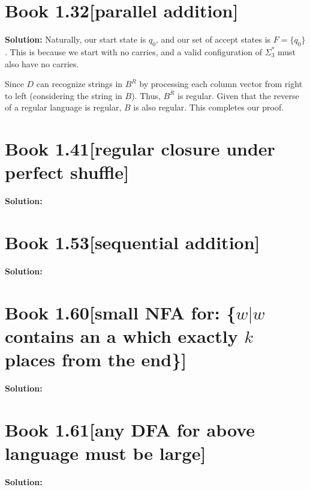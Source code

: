 \documentclass[11pt]{article}
\newenvironment{question}[2]
{\newpage\section{#1\texorpdfstring{\hfill}{horizontal spacing}{\rm\normalsize #2}}}{}
\newenvironment{solution}
{\textbf{Solution: }\color{blue}}
{\color{black}}
\begin{document}
\begin{question}{Book 1.32}{[parallel addition]}
\begin{solution}
Naturally, our start state is \(q_0\), and our set of accept states is \(F=\{q_0\}\). This is because we start with no carries, and a valid configuration of \(\Sigma_{3}^{*}\) must also have no carries.

Since \(D\) can recognize strings in \(B^{R}\) by processing each column vector from right to left (considering the string in \(B\)). Thus, \(B^{R}\) is regular. Given that the reverse of a regular language is regular, \(B\) is also regular. This completes our proof.

\end{solution}
\end{question}


\begin{question}{Book 1.41}{[regular closure under perfect shuffle]}


\begin{solution}

\end{solution}
\end{question}


\begin{question}{Book 1.53}{[sequential addition]}


\begin{solution}

\end{solution}
\end{question}


\begin{question}{Book 1.60}{[small NFA for: \{\(w | w\) contains an a which exactly \(k\) places from the end\}]}


\begin{solution}

\end{solution}
\end{question}


\begin{question}{Book 1.61}{[any DFA for above language must be large]}


\begin{solution}

\end{solution}
\end{question}
\end{document}
